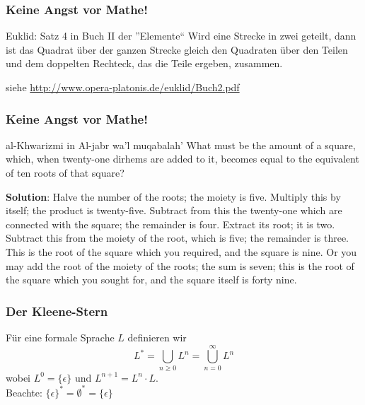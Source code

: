 \documentclass{beamer}
\begin{document}
\begin{frame} \frametitle{Keine Angst vor Mathe!}
	\begin{block}{Euklid: Satz 4 in Buch II der ''Elemente``}
		Wird eine Strecke in zwei geteilt, dann ist das Quadrat über der ganzen Strecke gleich den Quadraten über den Teilen und dem doppelten Rechteck, das die Teile ergeben, zusammen.
	\end{block}


	\small siehe \url{http://www.opera-platonis.de/euklid/Buch2.pdf}
\end{frame}

\begin{frame} \frametitle{Keine Angst vor Mathe!}
	\begin{block}{al-Khwarizmi in Al-jabr wa'l muqabalah'}
		\small What must be the amount of a square, which, when twenty-one
		dirhems are added to it, becomes equal to the equivalent of ten
		roots of that square?
		
		\textbf{Solution}: Halve the number of the roots; the moiety is five.
		Multiply this by itself; the product is twenty-five. Subtract from
		this the twenty-one which are connected with the square; the
		remainder is four. Extract its root; it is two. Subtract this from
		the moiety of the root, which is five; the remainder is three. This
		is the root of the square which you required, and the square is
		nine. Or you may add the root of the moiety of the roots; the
		sum is seven; this is the root of the square which you sought for,
		and the square itself is forty nine.
	\end{block}
\end{frame}

\begin{frame} \frametitle{Der Kleene-Stern}
	\begin{Definition}
		Für eine formale Sprache $L$ definieren wir
		\begin{equation*}
		L^\ast = \bigcup_{n \ge 0} L^n = \bigcup_{n = 0}^\infty L^n
		\end{equation*}
		wobei $L^0 = \{ \epsilon \}$ und $L^{n+1} = L^n \cdot L$. \\
		Beachte: $\{ \epsilon \}^\ast = \emptyset^\ast = \{ \epsilon \}$
	\end{Definition}
\end{frame}
\end{document}
